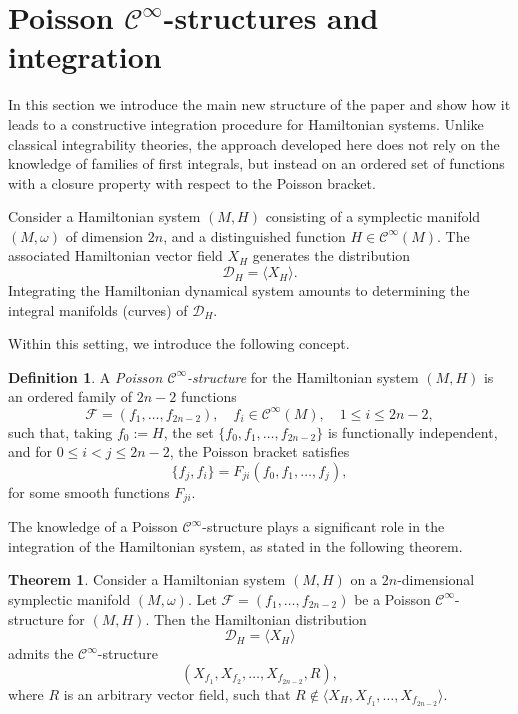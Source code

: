 \documentclass{article}
\theoremstyle{remark}
\theoremstyle{definition}
\newtheorem{theorem}{Theorem}[section]
\newtheorem{definition}{Definition}[section]
\newcommand{\cinf}{$\mathcal{C}^{\infty}$}
\begin{document}
\section{Poisson \texorpdfstring{\cinf}{cinf}-structures and integration}\label{poissoncinf}

In this section we introduce the main new structure of the paper and show how it
leads to a constructive integration procedure for Hamiltonian systems. Unlike
classical integrability theories, the approach developed here does not rely on
the knowledge of families of first integrals, but instead on an ordered set of functions with a closure property with respect to the Poisson bracket.

Consider a Hamiltonian system $(M,H)$ consisting of a symplectic manifold $(M,\omega)$ of dimension $2n$, and a distinguished function $H\in \mathcal{C}^\infty(M)$. The associated Hamiltonian vector field $X_H$ generates the distribution
\[
\mathcal{D}_H = \langle X_H \rangle.
\]
Integrating the Hamiltonian dynamical system amounts to determining
the integral manifolds (curves) of $\mathcal{D}_H$.

Within this setting, we introduce the following concept.

\begin{definition}\label{def:poisson-cinf}  
A \emph{Poisson \cinf-structure} for the Hamiltonian system $(M,H)$ is an
ordered family of $2n-2$ functions
\[
\mathcal{F} = (f_1,\dots,f_{2n-2}), \quad f_i \in\mathcal{C}^\infty(M), \quad 1 \leq i \leq 2n-2,
\]
such that, taking $f_0:=H$, the set $\{f_0,f_1,\dots,f_{2n-2}\}$ is functionally independent, 
and for $0\le i<j\le 2n-2$, the Poisson bracket satisfies
\begin{equation}\label{condicion}
    \{f_j,f_i\} = F_{ji}(f_0,f_1,\dots,f_j),
\end{equation}
for some smooth functions $F_{ji}$.
\end{definition}





The knowledge of a Poisson \cinf-structure plays a significant role in the integration of the Hamiltonian system, as stated in the following theorem.


\begin{theorem}\label{thm:main}
Consider a Hamiltonian system $(M,H)$ on a $2n$-dimensional symplectic manifold $(M,\omega)$. Let $\mathcal{F}=(f_1,\dots,f_{2n-2})$ be a Poisson \cinf-structure for $(M,H)$. Then the Hamiltonian distribution
\[
\mathcal{D}_H=\langle X_H\rangle
\]
admits the \cinf-structure 
\[
(X_{f_1},X_{f_2},\dots,X_{f_{2n-2}},R),
\]
where $R$ is an arbitrary vector field, such that $R\notin \langle X_H, X_{f_1},\dots,X_{f_{2n-2}}\rangle$.
\end{theorem}
\end{document}
